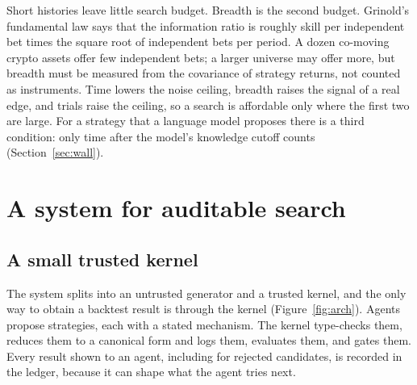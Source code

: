 \documentclass[11pt]{article}
\begin{document}
Short histories leave little search budget. Breadth is the second budget. Grinold's fundamental law \cite{grinold1989} says that the information ratio is roughly skill per independent bet times the square root of independent bets per period. A dozen co-moving crypto assets offer few independent bets; a larger universe may offer more, but breadth must be measured from the covariance of strategy returns, not counted as instruments. Time lowers the noise ceiling, breadth raises the signal of a real edge, and trials raise the ceiling, so a search is affordable only where the first two are large. For a strategy that a language model proposes there is a third condition: only time after the model's knowledge cutoff counts (Section~\ref{sec:wall}).

\section{A system for auditable search}\label{sec:system}

\subsection{A small trusted kernel}\label{sec:arch}

The system splits into an untrusted generator and a trusted kernel, and the only way to obtain a backtest result is through the kernel (Figure~\ref{fig:arch}). Agents propose strategies, each with a stated mechanism. The kernel type-checks them, reduces them to a canonical form and logs them, evaluates them, and gates them. Every result shown to an agent, including for rejected candidates, is recorded in the ledger, because it can shape what the agent tries next.
\end{document}

